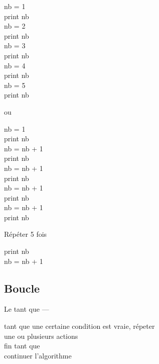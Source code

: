 \begin{frame}
  \begin{minipage}{5cm}
    \begin{langagenaturel}
      nb = 1\\
      print nb\\
      nb = 2\\
      print nb\\
      nb = 3\\
      print nb\\
      nb = 4\\
      print nb\\
      nb = 5\\
      print nb\\
    \end{langagenaturel}
  \end{minipage}
  \pause
  \hfill ou \hfill
  \begin{minipage}{5cm}
    \begin{langagenaturel}
      nb = 1\\
      print nb\\
      nb = nb + 1\\
      print nb\\
      nb = nb + 1\\
      print nb\\
      nb = nb + 1\\
      print nb\\
      nb = nb + 1\\
      print nb\\
    \end{langagenaturel}
  \end{minipage}

  \pause
  \begin{block}{Répéter 5 fois}
  \begin{langagenaturel}
    print nb\\
    nb = nb + 1
  \end{langagenaturel}
  \end{block}
\end{frame}

\subsection{Boucle }
\begin{frame}{Le \og tant que \fg --- }
  \begin{langagenaturel}
    tant que une certaine condition est vraie, répeter\\
      \tab une ou plusieurs actions\\
    fin tant que\\
    continuer l'algorithme 
  \end{langagenaturel}
\end{frame}

